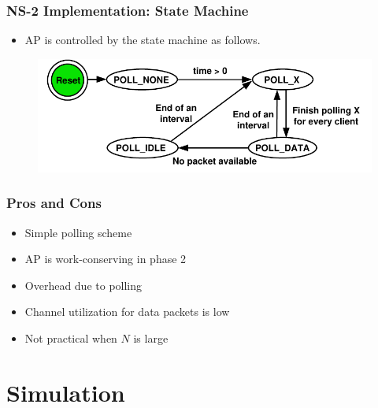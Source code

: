 \documentclass{beamer}
\begin{document}
\begin{frame}
\frametitle{NS-2 Implementation: State Machine}
\begin{itemize}
\item AP is controlled by the state machine as follows.
\end{itemize}
\begin{figure}
\centering
\includegraphics[scale=0.8]{state_machine.pdf}
\end{figure}
\end{frame}


\begin{frame}
\frametitle{Pros and Cons}
\color{blue}{Pros:}
\begin{itemize}
\item Simple polling scheme
\item AP is work-conserving in phase 2 
\end{itemize}
\color{blue}{Cons:}
\begin{itemize}
\item Overhead due to polling
\item Channel utilization for data packets is low
\item Not practical when $N$ is large
\end{itemize}
\end{frame}


\section{Simulation}
\end{document}
